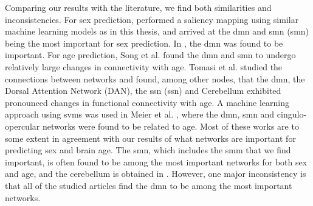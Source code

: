 Comparing our results with the literature, we find both similarities and inconsistencies. For sex prediction, \cite{understanding_gnn} performed a saliency mapping using similar machine learning models as in this thesis, and arrived at the \acrshort{dmn} and \acrlong{smn} (\acrshort{smn}) being the most important for sex prediction. In \cite{arslan}, the \acrshort{dmn} was found to be important. For age prediction, Song et al. \cite{song_reorganizational} found the \acrshort{dmn} and \acrshort{smn} to undergo relatively large changes in connectivity with age. Tomasi et al. \cite{tomasi_aging} studied the connections between networks and found, among other nodes, that the \acrshort{dmn}, the Dorsal Attention Network (DAN), the \acrlong{ssn} (\acrshort{ssn}) and Cerebellum exhibited pronounced changes in functional connectivity with age. A machine learning approach using \acrshort{svm}s was used in Meier et al. \cite{meier_svm}, where the \acrshort{dmn}, \acrshort{smn} and cingulo-opercular networks were found to be related to age. Most of these works are to some extent in agreement with our results of what networks are important for predicting sex and brain age. The \acrshort{smn}, which includes the \acrshort{smm} that we find important, is often found to be among the most important networks for both sex and age, and the cerebellum is obtained in \cite{tomasi_aging}. However, one major inconsistency is that all of the studied articles find the \acrshort{dmn} to be among the most important networks. 


